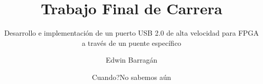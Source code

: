 \author[E. Barragán]{Edwin Barragán}
\newcommand{\asesores}{Mag.~Ing.~Cristian Sisterna\hfill Mgtr.~Ing.~Martín~Perez\hfill Dr.~Ing~Marcelo~Segura\hfill}
\title{Trabajo Final de Carrera}
\newcommand{\carrera}{Ingeniería Electrónica}
\subtitle{Desarrollo e implementación de un puerto USB 2.0 de alta velocidad para
	FPGA a través de un puente específico}
\date{Cuando?No sabemos aún}
